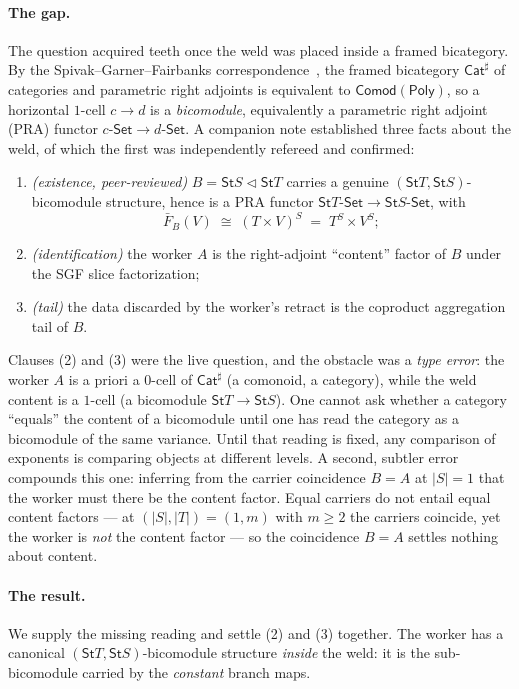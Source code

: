 \documentclass[11pt]{article}
\newcommand{\comp}{\mathbin{\triangleleft}}       %
\newcommand{\Set}{\mathsf{Set}}
\newcommand{\Poly}{\mathsf{Poly}}
\newcommand{\Cat}{\mathsf{Cat}^{\sharp}}
\newcommand{\Comod}{\mathsf{Comod}}
\newcommand{\St}{\mathsf{St}}                      %
\theoremstyle{plain}
\theoremstyle{definition}
\theoremstyle{remark}
\begin{document}
\paragraph{The gap.}
The question acquired teeth once the weld was placed inside a framed bicategory.
By the Spivak--Garner--Fairbanks correspondence~\cite{SGF}, the framed bicategory $\Cat$
of categories and parametric right adjoints is equivalent to $\Comod(\Poly)$, so a
horizontal $1$-cell $c\to d$ is a \emph{bicomodule}, equivalently a parametric right
adjoint (PRA) functor $c\text{-}\Set\to d\text{-}\Set$. A companion note established three
facts about the weld, of which the first was independently refereed and confirmed:
\begin{enumerate}[label=(\arabic*),leftmargin=2.2em]
\item \emph{(existence, peer-reviewed)} $B=\St S\comp\St T$ carries a genuine
  $(\St T,\St S)$-bicomodule structure, hence is a PRA functor
  $\St T\text{-}\Set\to\St S\text{-}\Set$, with
  \[
     \bar F_B(V)\;\cong\;(T\times V)^S\;=\;T^S\times V^S ;
  \]
\item \emph{(identification)} the worker $A$ is the right-adjoint ``content'' factor of
  $B$ under the SGF slice factorization;
\item \emph{(tail)} the data discarded by the worker's retract is the coproduct
  aggregation tail of $B$.
\end{enumerate}
Clauses (2) and (3) were the live question, and the obstacle was a \emph{type error}:
the worker $A$ is a priori a $0$-cell of $\Cat$ (a comonoid, a category), while the weld
content is a $1$-cell (a bicomodule $\St T\to\St S$). One cannot ask whether a category
``equals'' the content of a bicomodule until one has read the category as a bicomodule of
the same variance. Until that reading is fixed, any comparison of exponents is comparing
objects at different levels. A second, subtler error compounds this one: inferring from the
carrier coincidence $B=A$ at $|S|=1$ that the worker must there be the content factor. Equal
carriers do not entail equal content factors --- at $(|S|,|T|)=(1,m)$ with $m\ge2$ the
carriers coincide, yet the worker is \emph{not} the content factor --- so the coincidence
$B=A$ settles nothing about content.

\paragraph{The result.}
We supply the missing reading and settle (2) and (3) together. The worker has a canonical
$(\St T,\St S)$-bicomodule structure \emph{inside} the weld: it is the sub-bicomodule
carried by the \emph{constant} branch maps.
\end{document}
